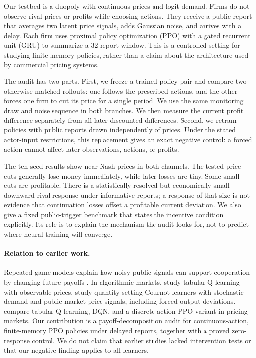 \documentclass{article}
\begin{document}
Our testbed is a duopoly with continuous prices and logit demand. Firms do not observe rival prices or profits while choosing actions. They receive a public report that averages two latent price signals, adds Gaussian noise, and arrives with a delay. Each firm uses proximal policy optimization (PPO) with a gated recurrent unit (GRU) to summarize a 32-report window. This is a controlled setting for studying finite-memory policies, rather than a claim about the architecture used by commercial pricing systems.

The audit has two parts. First, we freeze a trained policy pair and compare two otherwise matched rollouts: one follows the prescribed actions, and the other forces one firm to cut its price for a single period. We use the same monitoring draw and noise sequence in both branches. We then measure the current profit difference separately from all later discounted differences. Second, we retrain policies with public reports drawn independently of prices. Under the stated actor-input restrictions, this replacement gives an exact negative control: a forced action cannot affect later observations, actions, or profits.

The ten-seed results show near-Nash prices in both channels. The tested price cuts generally lose money immediately, while later losses are tiny. Some small cuts are profitable. There is a statistically resolved but economically small downward rival response under informative reports; a response of that size is not evidence that continuation losses offset a profitable current deviation. We also give a fixed public-trigger benchmark that states the incentive condition explicitly. Its role is to explain the mechanism the audit looks for, not to predict where neural training will converge.

\paragraph{Relation to earlier work.}
Repeated-game models explain how noisy public signals can support cooperation by changing future payoffs \citep{green1984noncooperative,abreu1990toward,fudenberg1994folk}. In algorithmic markets, \citet{calvano2020artificial} study tabular Q-learning with observable prices. \citet{calvano2021algorithmic} study quantity-setting Cournot learners with stochastic demand and public market-price signals, including forced output deviations. \citet{deng2025exploring} compare tabular Q-learning, DQN, and a discrete-action PPO variant in pricing markets. Our contribution is a payoff-decomposition audit for continuous-action, finite-memory PPO policies under delayed reports, together with a proved zero-response control. We do not claim that earlier studies lacked intervention tests or that our negative finding applies to all learners.
\end{document}
